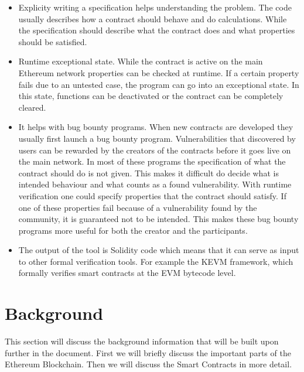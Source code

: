 \documentclass[a4paper]{article}
\begin{document}
\begin{itemize}
    \item Explicity writing a specification helps understanding the problem. The code usually describes how a contract should behave and do calculations. While the specification should describe what the contract does and what properties should be satisfied.
    \item Runtime exceptional state. While the contract is active on the main Ethereum network properties can be checked at runtime. If a certain property fails due to an untested case, the program can go into an exceptional state. In this state, functions can be deactivated or the contract can be completely cleared. 
    \item It helps with bug bounty programs. When new contracts are developed they usually first launch a bug bounty program. Vulnerabilities that discovered by users can be rewarded by the creators of the contracts before it goes live on the main network. In most of these programs the specification of what the contract should do is not given. This makes it difficult do decide what is intended behaviour and what counts as a found vulnerability. With runtime verification one could specify properties that the contract should satisfy. If one of these properties fail because of a vulnerability found by the community, it is guaranteed not to be intended. This makes these bug bounty programs more useful for both the creator and the participants. 
    \item  The output of the tool is Solidity code which means that it can serve as input to other formal verification tools. For example the KEVM framework, which formally verifies smart contracts at the EVM bytecode level. 
\end{itemize}



\section{Background}
This section will discuss the background information that will be built upon further in the document. First we will briefly discuss the important parts of the Ethereum Blockchain. Then we will discuss the Smart Contracts in more detail.
\end{document}
